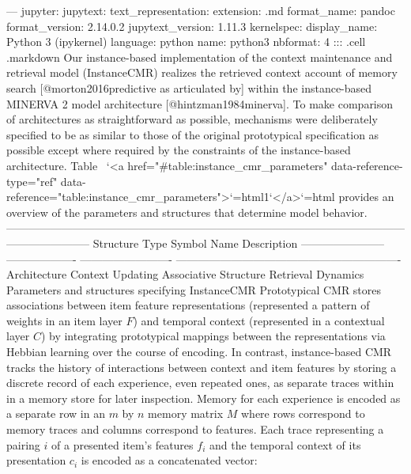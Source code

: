 --- jupyter: jupytext: text_representation: extension: .md format_name: pandoc format_version: 2.14.0.2 jupytext_version: 1.11.3 kernelspec: display_name: Python 3 (ipykernel) language: python name: python3 nbformat: 4\markdownRendererInterblockSeparator
{}\markdownRendererInterblockSeparator
{}::: {.cell .markdown} Our instance-based implementation of the context maintenance and retrieval model (InstanceCMR) realizes the retrieved context account of memory search [@morton2016predictive as articulated by] within the instance-based MINERVA 2 model architecture [@hintzman1984minerva]. To make comparison of architectures as straightforward as possible, mechanisms were deliberately specified to be as similar to those of the original prototypical specification as possible except where required by the constraints of the instance-based architecture. Table  `<a href="#table:instance_cmr_parameters" data-reference-type="ref" data-reference="table:instance_cmr_parameters">`{=html}1`</a>`{=html} provides an overview of the parameters and structures that determine model behavior.\markdownRendererInterblockSeparator
{}----------------------------------------------------------------------------------------------------------------------------------- Structure Type Symbol Name Description ----------------------- ------------------- ------------------------- ------------------------------------------------------------- Architecture \markdownRendererInterblockSeparator
{}\markdownRendererInterblockSeparator
{}Context Updating \markdownRendererInterblockSeparator
{}\markdownRendererInterblockSeparator
{}Associative Structure \markdownRendererInterblockSeparator
{}\markdownRendererInterblockSeparator
{}Retrieval Dynamics \markdownRendererInterblockSeparator
{}\markdownRendererInterblockSeparator
{}\markdownRendererHorizontalRule{}\markdownRendererInterblockSeparator
{}Parameters and structures specifying InstanceCMR\markdownRendererInterblockSeparator
{}\markdownRendererInterblockSeparator
{}Prototypical CMR stores associations between item feature representations (represented a pattern of weights in an item layer $F$) and temporal context (represented in a contextual layer $C$) by integrating prototypical mappings between the representations via Hebbian learning over the course of encoding. In contrast, instance-based CMR tracks the history of interactions between context and item features by storing a discrete record of each experience, even repeated ones, as separate traces within in a memory store for later inspection. Memory for each experience is encoded as a separate row in an $m$ by $n$ memory matrix $M$ where rows correspond to memory traces and columns correspond to features. Each trace representing a pairing $i$ of a presented item's features $f_i$ and the temporal context of its presentation $c_i$ is encoded as a concatenated vector:\markdownRendererInterblockSeparator
